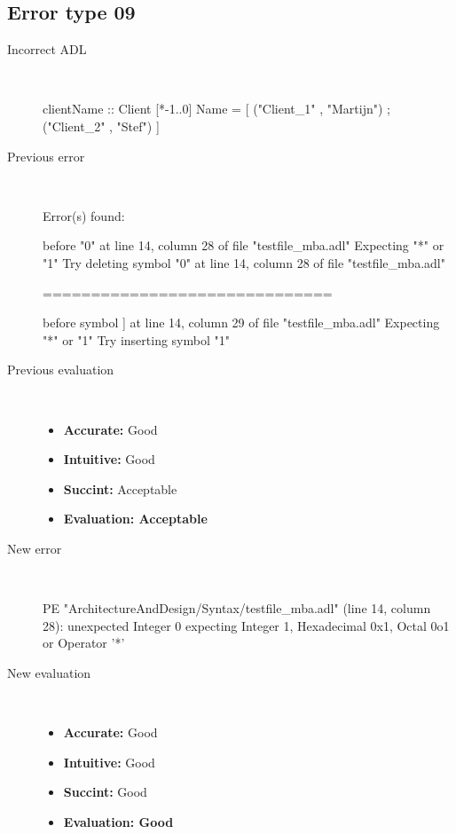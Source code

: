 \hrulefill

\subsection{Error type 09}
  \begin{description}
  \item[Incorrect ADL]~\\
\begin{adl}
clientName :: Client [*-1..0] Name =
    [ ("Client_1"      , "Martijn")
    ; ("Client_2"      , "Stef")
    ]\end{adl}
  \item[Previous error]~\\
\begin{haskell}
Error(s) found:

before "0" at line 14, column 28 of file "testfile_mba.adl"
Expecting "*" or "1"
Try deleting symbol "0" at line 14, column 28 of file "testfile_mba.adl"

==============================

before symbol ] at line 14, column 29 of file "testfile_mba.adl"
Expecting "*" or "1"
Try inserting symbol "1"\end{haskell}
  \item[Previous evaluation]~\\
    \begin{itemize}
    \item \textbf{Accurate:} Good
    \item \textbf{Intuitive:} Good
    \item \textbf{Succint:} Acceptable
    \item \textbf{Evaluation: Acceptable}
    \end{itemize}
  \item[New error]~\\
\begin{haskell}
PE "ArchitectureAndDesign/Syntax/testfile_mba.adl" (line 14, column 28):
unexpected Integer 0
expecting Integer 1, Hexadecimal 0x1, Octal 0o1 or Operator '*'\end{haskell}
  \item[New evaluation]~\\
    \begin{itemize}
    \item \textbf{Accurate:} Good
    \item \textbf{Intuitive:} Good
    \item \textbf{Succint:} Good
    \item \textbf{Evaluation: Good
}
    \end{itemize}
  \end{description}

